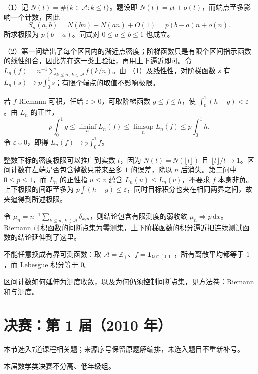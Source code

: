 \documentclass[UTF8,12pt,a4paper,fontset=fandol]{ctexart}
\begin{document}
\begin{solve}\label{ans:ch01-17th-A:6}

（1）记 $N(t)=\#\{k\in\mathcal A:k\leq t\}$。题设即 $N(t)=pt+o(t)$，而端点至多影响一个计数，因此
\[
S_n(a,b)=N(bn)-N(an)+O(1)=p(b-a)n+o(n).
\]
所求极限为 $p(b-a)$。同式对 $0\leq a\leq b\leq1$ 也成立。

（2）第一问给出了每个区间内的渐近点密度；阶梯函数只是有限个区间指示函数的线性组合，因此先在这一类上验证，再用上下逼近即可。令 $L_n(f)=n^{-1}\sum_{k\leq n,\,k\in\mathcal A}f(k/n)$。由 （1）及线性性，对阶梯函数 $s$ 有 $L_n(s)\to p\int_0^1s$；有限个端点的取值不影响极限。

若 $f$ Riemann 可积，任给 $\varepsilon>0$，可取阶梯函数 $g\leq f\leq h$，使 $\int_0^1(h-g)<\varepsilon$。由 $L_n$ 的正性，
\[
p\int_0^1g\leq\liminf_nL_n(f)
\leq\limsup_nL_n(f)\leq p\int_0^1h.
\]
令 $\varepsilon\downarrow0$，即得 $L_n(f)\to p\int_0^1f$。

整数下标的密度极限可以推广到实数 $t$，因为 $N(t)=N(\lfloor t\rfloor)$ 且 $\lfloor t\rfloor/t\to1$。区间计数在左端是否包含整数只带来至多 $1$ 的误差，除以 $n$ 后消失。第二问中 $0\le p\le1$，而 $L_n$ 的正性指 $u\le v$ 蕴含 $L_n(u)\le L_n(v)$，不要求 $f$ 本身非负。上下极限的间距至多为 $p\int(h-g)\le\varepsilon$，同时目标积分也夹在相同两界之间，故夹逼得到所述极限。

\end{solve}

\begin{remark}[方法与条件]令 $\mu_n=n^{-1}\sum_{k\leq n,\,k\in\mathcal A}\delta_{k/n}$，则结论包含有限测度的弱收敛 $\mu_n\Rightarrow p\,\mathrm dx$。Riemann 可积函数的间断点集为零测集，上下阶梯函数的积分逼近把连续测试函数的结论延伸到了这里。

不能任意换成有界可测函数：取 $\mathcal A=\mathbb Z_+$、$f=\mathbf1_{\mathbb Q\cap[0,1]}$，所有离散平均都等于 $1$，而 Lebesgue 积分等于 $0$。

区间计数如何延伸为测度收敛，以及为何仍须控制间断点集，见\hyperref[app:integration-riemann]{方法卷：Riemann 和与测度}。\end{remark}

\section{决赛：第 1 届（2010 年）}

本节选入7道课程相关题；来源序号保留原题解编排，未选入题目不重新补号。

\begin{remark}[来源说明]本届数学类决赛不分高、低年级组。\end{remark}
\end{document}

